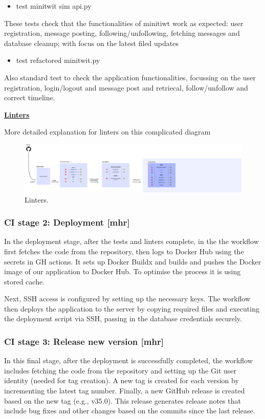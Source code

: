 \documentclass{article}
\begin{document}
\begin{itemize}
    \item test minitwit sim api.py
\end{itemize}
These tests check that the functionalities of minitiwt work as expected: user registration, message posting, following/unfollowing, fetching messages and database cleanup; with focus on the latest filed updates
    
\begin{itemize}
    \item test refactored minitwit.py
\end{itemize}
Also standard test to check the application functionalities, focussing on the user registration, login/logout and message post and retriecal, follow/unfollow and correct timeline.

\noindent \textbf{\underline{Linters}} 

More detailed explanation for linters on this complicated diagram

\begin{figure}[ht]
    \centering
    \includegraphics[width=1.0\textwidth]{./pdfs/linter.pdf} 
    \caption{Linters.}
    \label{fig:Linter}
\end{figure}


\subsubsection{CI stage 2: Deployment [mhr]}
In the deployment stage, after the tests and linters complete, in the the workflow first fetches the code from the repository, then logs to Docker Hub using the secrets in GH actions. It sets up Docker Buildx and builds and pushes the Docker image of our application to Docker Hub. To optimise the process it is using stored cache.

Next, SSH access is configured by setting up the necessary keys. The workflow then deploys the application to the server by copying required files and executing the deployment script via SSH, passing in the database credentials securely.

\subsubsection{CI stage 3: Release new version [mhr]}
In this final stage, after the deployment is successfully completed, the workflow includes fetching the code from the repository and setting up the Git user identity (needed for tag creation). A new tag is created for each version by incrementing the latest tag number. Finally, a new GitHub release is created based on the new tag (e.g., v35.0). This release generates release notes that include bug fixes and other changes based on the commits since the last release.
\end{document}
